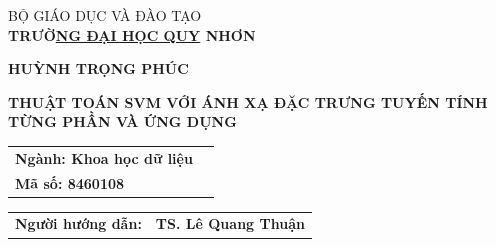 \newpage
\thispagestyle{empty}
\begin{center}
\large BỘ GIÁO DỤC VÀ ĐÀO TẠO\\
{\bf \large TRƯỜ\underline{NG ĐẠI HỌC QUY} NHƠN}

\vspace*{2.5cm}

{\bf \large HUỲNH TRỌNG PHÚC}
\vspace*{2cm}

\begin{center}
\Large{\textbf{ THUẬT TOÁN SVM VỚI ÁNH XẠ ĐẶC TRƯNG TUYẾN TÍNH TỪNG PHẦN VÀ ỨNG DỤNG }}
\end{center}
\vspace*{2cm} 
  
\begin{tabular}{l  l }
 \fontsize{12pt}{26}\selectfont \textbf{Ngành: Khoa học dữ liệu} \\
 \fontsize{12pt}{26}\selectfont \textbf{Mã số: 8460108}
\end{tabular}
\vspace*{2cm}

\begin{tabular}{l l }
\bf\fontsize{14pt}{20}\selectfont Người hướng dẫn:&\bf\fontsize{14pt}{20}\selectfont TS. Lê Quang Thuận
\end{tabular}  

\vfill

\end{center}